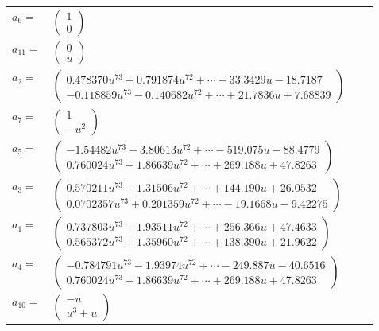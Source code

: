 \documentclass[1p]{elsarticle_modified}
\theoremstyle{definition}
\begin{document}
\begin{tabular}{m{7pt} m{180pt} m{7pt} m{180pt} }
\flushright $a_{6}=$&$\begin{pmatrix}1\\0\end{pmatrix}$ \\
\flushright $a_{11}=$&$\begin{pmatrix}0\\u\end{pmatrix}$ \\
\flushright $a_{2}=$&$\begin{pmatrix}0.478370 u^{73}+0.791874 u^{72}+\cdots-33.3429 u-18.7187\\-0.118859 u^{73}-0.140682 u^{72}+\cdots+21.7836 u+7.68839\end{pmatrix}$ \\
\flushright $a_{7}=$&$\begin{pmatrix}1\\- u^2\end{pmatrix}$ \\
\flushright $a_{5}=$&$\begin{pmatrix}-1.54482 u^{73}-3.80613 u^{72}+\cdots-519.075 u-88.4779\\0.760024 u^{73}+1.86639 u^{72}+\cdots+269.188 u+47.8263\end{pmatrix}$ \\
\flushright $a_{3}=$&$\begin{pmatrix}0.570211 u^{73}+1.31506 u^{72}+\cdots+144.190 u+26.0532\\0.0702357 u^{73}+0.201359 u^{72}+\cdots-19.1668 u-9.42275\end{pmatrix}$ \\
\flushright $a_{1}=$&$\begin{pmatrix}0.737803 u^{73}+1.93511 u^{72}+\cdots+256.366 u+47.4633\\0.565372 u^{73}+1.35960 u^{72}+\cdots+138.390 u+21.9622\end{pmatrix}$ \\
\flushright $a_{4}=$&$\begin{pmatrix}-0.784791 u^{73}-1.93974 u^{72}+\cdots-249.887 u-40.6516\\0.760024 u^{73}+1.86639 u^{72}+\cdots+269.188 u+47.8263\end{pmatrix}$ \\
\flushright $a_{10}=$&$\begin{pmatrix}- u\\u^3+u\end{pmatrix}$ \\

\end{tabular}
\end{document}
